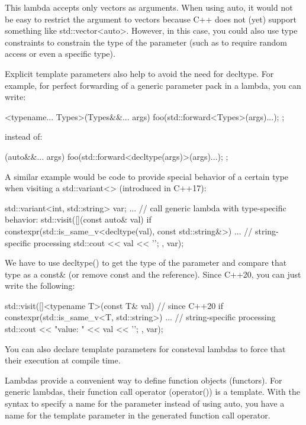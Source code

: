 This lambda accepts only vectors as arguments. When using auto, it would not be easy to restrict the argument to vectors because C++ does not (yet) support something like std::vector<auto>. However, in this case, you could also use type constraints to constrain the type of the parameter (such as to require random access or even a specific type).

Explicit template parameters also help to avoid the need for decltype. For example, for perfect forwarding of a generic parameter pack in a lambda, you can write:

\begin{cpp}
[]<typename... Types>(Types&&... args) {
	foo(std::forward<Types>(args)...);
};
\end{cpp}

instead of:

\begin{cpp}
[] (auto&&... args) {
	foo(std::forward<decltype(args)>(args)...);
};
\end{cpp}

A similar example would be code to provide special behavior of a certain type when visiting a std::variant<> (introduced in C++17):

\begin{cpp}
std::variant<int, std::string> var;
...
// call generic lambda with type-specific behavior:
std::visit([](const auto& val) {
				if constexpr(std::is_same_v<decltype(val), const std::string&>) {
					... // string-specific processing
				}
				std::cout << val << '\n';
			},
			var);
\end{cpp}

We have to use decltype() to get the type of the parameter and compare that type as a const\& (or remove const and the reference). Since C++20, you can just write the following:

\begin{cpp}
std::visit([]<typename T>(const T& val) { // since C++20
				if constexpr(std::is_same_v<T, std::string>) {
					... // string-specific processing
				}
				std::cout << "value: " << val << '\n';
			},
			var);
\end{cpp}

You can also declare template parameters for consteval lambdas to force that their execution at compile time.


Lambdas provide a convenient way to define function objects (functors). For generic lambdas, their function call operator (operator()) is a template. With the syntax to specify a name for the parameter instead of using auto, you have a name for the template parameter in the generated function call operator.

